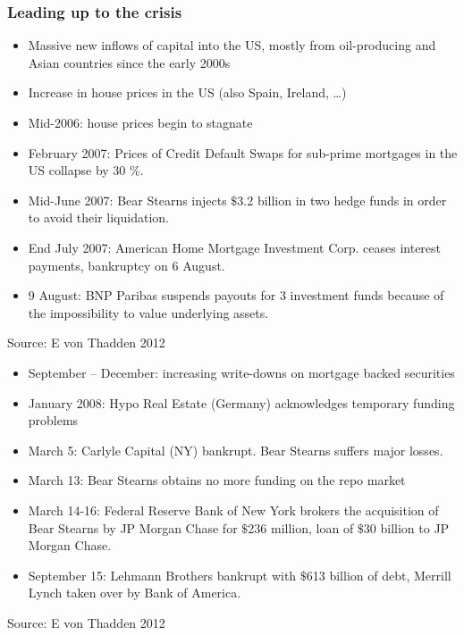 \documentclass[11pt]{beamer}
\begin{document}
\begin{frame}
\frametitle{Leading up to the crisis}
\begin{itemize}
\item Massive new inflows of capital into the US, mostly from oil-producing and Asian countries since the early 2000s
\item Increase in house prices in the US (also Spain,
Ireland, …)
\item Mid-2006: house prices begin to stagnate
\item February 2007: Prices of Credit Default Swaps for sub-prime
mortgages in the US collapse by 30 $\%$.
\item Mid-June 2007: Bear Stearns injects $\$$3.2 billion in two hedge funds in order to avoid their liquidation.
\item End July 2007: American Home Mortgage Investment Corp. ceases
interest payments, bankruptcy on 6 August.
\item 9 August: BNP Paribas suspends payouts for 3 investment funds
because of the impossibility to value underlying assets.
\end{itemize}
\tiny{Source: E von Thadden 2012}
\end{frame}


\begin{frame}
\begin{itemize}
\item September – December: increasing write-downs on
mortgage backed securities
\item January 2008: Hypo Real Estate (Germany) acknowledges
temporary funding problems
\item March 5: Carlyle Capital (NY) bankrupt. Bear Stearns suffers major losses.
\item March 13: Bear Stearns obtains no more funding on the repo market
\item March 14-16: Federal Reserve Bank of New York brokers the acquisition of Bear Stearns by JP Morgan Chase for $\$$236 million, loan of $\$$30 billion to JP Morgan Chase.
\item September 15: Lehmann Brothers bankrupt with $\$$613 billion of debt, Merrill Lynch taken over by Bank of America.
\end{itemize}
\tiny{Source: E von Thadden 2012}
\end{frame}
\end{document}
